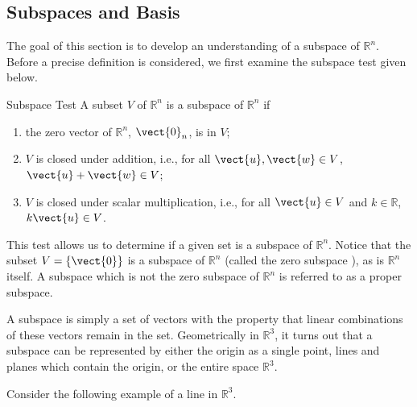 \subsection{Subspaces and Basis}

The goal of this section is to develop an understanding of a subspace of $\mathbb{R}^n$. Before a precise definition is considered, we first examine the subspace test given below.

\begin{theorem}{Subspace Test}\label{thm:subspacetest}
A subset $V$ of $\mathbb{R}^n$ is a subspace of $\mathbb{R}^n$ if 
\begin{enumerate}
\item the zero vector of $\mathbb{R}^n$, $\vect{0}_n$, is in $V$;
\item $V$ is closed under addition, i.e., for all $\vect{u},\vect{w}\in V$, $\vect{u}+\vect{w}\in V$;
\item $V$ is closed under scalar multiplication, i.e., for all $\vect{u}\in V$
and $k\in\mathbb{R}$, $k\vect{u}\in V$.
\end{enumerate}
\end{theorem}

This test allows us to determine if a given set is a subspace of $\mathbb{R}^n$. Notice that the subset $V = \left\{ \vect{0} \right\}$ is a subspace of $\mathbb{R}^n$ (called the zero subspace ), as is $\mathbb{R}^n$ itself. A subspace which is not the zero subspace of $\mathbb{R}^n$ is referred to as a proper subspace.

 A subspace is simply a set of vectors with the property that linear
combinations of these vectors remain in the set. Geometrically in
$\mathbb{R}^{3}$, it turns out that a subspace can be represented by
either the origin as a single point, lines and planes which contain
the origin, or the entire space $\mathbb{R}^{3}$. 

Consider the following example of a line in $\mathbb{R}^3$. 

